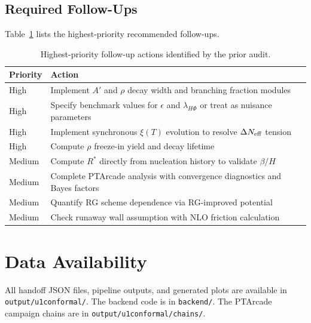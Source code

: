 \documentclass[a4paper,11pt]{article}
\begin{document}
\subsection{Required Follow-Ups}

Table~\ref{tab:followups} lists the highest-priority recommended follow-ups.

\begin{table}[htbp]
\centering
\caption{Highest-priority follow-up actions identified by the prior audit.}
\label{tab:followups}
\begin{tabularx}{\textwidth}{lX}
\toprule
Priority & Action \\
\midrule
High & Implement $A'$ and $\rho$ decay width and branching fraction modules \\
High & Specify benchmark values for $\epsilon$ and $\lambda_{H\Phi}$ or treat as nuisance parameters \\
High & Implement synchronous $\xi(T)$ evolution to resolve $\Delta N_{\rm eff}$ tension \\
High & Compute $\rho$ freeze-in yield and decay lifetime \\
Medium & Compute $R^*$ directly from nucleation history to validate $\beta/H$ \\
Medium & Complete PTArcade analysis with convergence diagnostics and Bayes factors \\
Medium & Quantify RG scheme dependence via RG-improved potential \\
Medium & Check runaway wall assumption with NLO friction calculation \\
\bottomrule
\end{tabularx}
\end{table}

\section{Data Availability}

All handoff JSON files, pipeline outputs, and generated plots are available in \texttt{output/u1conformal/}. The backend code is in \texttt{backend/}. The PTArcade campaign chains are in \texttt{output/u1conformal/chains/}.
\end{document}
